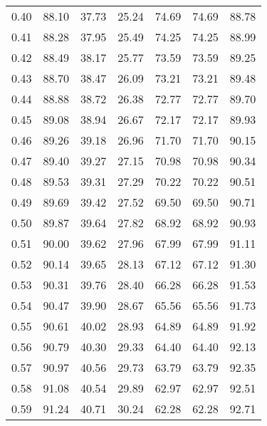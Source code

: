 \begin{tabular}{|c|c|c|c|c|c|c|}
      0.40 &     88.10 &     37.73 &      25.24 &   74.69 &      74.69 &         88.78 \\
      0.41 &     88.28 &     37.95 &      25.49 &   74.25 &      74.25 &         88.99 \\
      0.42 &     88.49 &     38.17 &      25.77 &   73.59 &      73.59 &         89.25 \\
      0.43 &     88.70 &     38.47 &      26.09 &   73.21 &      73.21 &         89.48 \\
      0.44 &     88.88 &     38.72 &      26.38 &   72.77 &      72.77 &         89.70 \\
      0.45 &     89.08 &     38.94 &      26.67 &   72.17 &      72.17 &         89.93 \\
      0.46 &     89.26 &     39.18 &      26.96 &   71.70 &      71.70 &         90.15 \\
      0.47 &     89.40 &     39.27 &      27.15 &   70.98 &      70.98 &         90.34 \\
      0.48 &     89.53 &     39.31 &      27.29 &   70.22 &      70.22 &         90.51 \\
      0.49 &     89.69 &     39.42 &      27.52 &   69.50 &      69.50 &         90.71 \\
      0.50 &     89.87 &     39.64 &      27.82 &   68.92 &      68.92 &         90.93 \\
      0.51 &     90.00 &     39.62 &      27.96 &   67.99 &      67.99 &         91.11 \\
      0.52 &     90.14 &     39.65 &      28.13 &   67.12 &      67.12 &         91.30 \\
      0.53 &     90.31 &     39.76 &      28.40 &   66.28 &      66.28 &         91.53 \\
      0.54 &     90.47 &     39.90 &      28.67 &   65.56 &      65.56 &         91.73 \\
      0.55 &     90.61 &     40.02 &      28.93 &   64.89 &      64.89 &         91.92 \\
      0.56 &     90.79 &     40.30 &      29.33 &   64.40 &      64.40 &         92.13 \\
      0.57 &     90.97 &     40.56 &      29.73 &   63.79 &      63.79 &         92.35 \\
      0.58 &     91.08 &     40.54 &      29.89 &   62.97 &      62.97 &         92.51 \\
      0.59 &     91.24 &     40.71 &      30.24 &   62.28 &      62.28 &         92.71 \\

\end{tabular}
